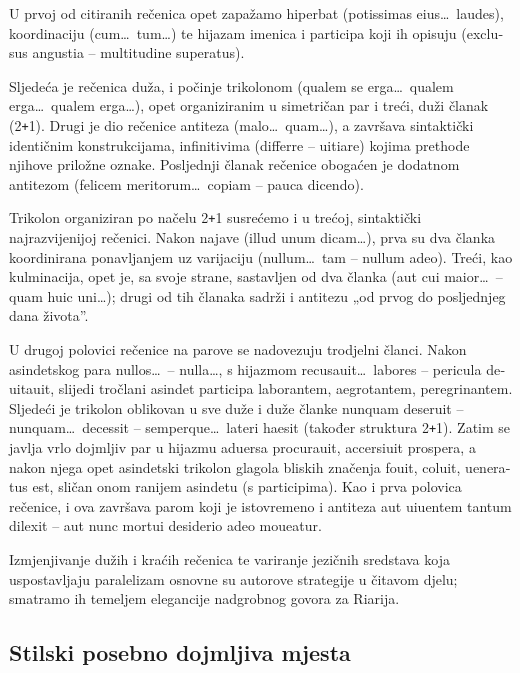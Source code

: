 \documentclass[a5paper,twoside]{article}
\begin{document}
U prvoj od citiranih rečenica opet zapažamo hiperbat \textlatin{(potissimas eius\dots\ laudes)}, koordinaciju \textlatin{(cum\dots\ tum\dots)} te hijazam imenica i participa koji ih opisuju \textlatin{(exclusus angustia – multitudine superatus).}

Sljedeća je rečenica duža, i počinje trikolonom \textlatin{(qualem se erga\dots\ qualem erga\dots\ qualem erga\dots),} opet organiziranim u simetričan par i treći, duži članak (2{}\verb!+!1). Drugi je dio rečenice antiteza \textlatin{(malo\dots\ quam\dots)}, a završava sintaktički identičnim konstrukcijama, infinitivima \textlatin{(differre – uitiare)} kojima prethode njihove priložne oznake. Posljednji članak rečenice obogaćen je dodatnom antitezom \textlatin{(felicem meritorum\dots\ copiam – pauca dicendo).}

Trikolon organiziran po načelu 2{}\verb!+!1 susrećemo i u trećoj, sintaktički najrazvijenijoj rečenici. Nakon najave \textlatin{(illud unum dicam\dots),} prva su dva članka koordinirana ponavljanjem uz varijaciju \textlatin{(nullum\dots\ tam – nullum adeo).} Treći, kao kulminacija, opet je, sa svoje strane, sastavljen od dva članka \textlatin{(aut cui maior\dots\ – quam huic uni\dots);} drugi od tih članaka sadrži i antitezu „od prvog do posljednjeg dana života”. 

U drugoj polovici rečenice na parove se nadovezuju trodjelni članci. Nakon asindetskog para \textlatin{nullos\dots\ – nulla\dots,} s hijazmom \textlatin{recusauit\dots\ labores – pericula deuitauit,} slijedi tročlani asindet participa \textlatin{laborantem, aegrotantem, peregrinantem.} Sljedeći je trikolon oblikovan u sve duže i duže članke \textlatin{nunquam deseruit – nunquam\dots\ decessit – semperque\dots\ lateri haesit} (također struktura 2{}\verb!+!1). Zatim se javlja vrlo dojmljiv par u hijazmu \textlatin{aduersa procurauit, accersiuit prospera,} a nakon njega opet asindetski trikolon glagola bliskih značenja \textlatin{fouit, coluit, ueneratus est,} sličan onom ranijem asindetu (s participima). Kao i prva polovica rečenice, i ova završava parom koji je istovremeno i antiteza \textlatin{aut uiuentem tantum dilexit – aut nunc mortui desiderio adeo moueatur.}

Izmjenjivanje dužih i kraćih rečenica te variranje jezičnih sredstava koja uspostavljaju paralelizam osnovne su autorove strategije u čitavom djelu; smatramo ih temeljem elegancije nadgrobnog govora za Riarija.

\subsection{Stilski posebno dojmljiva mjesta}
\end{document}
